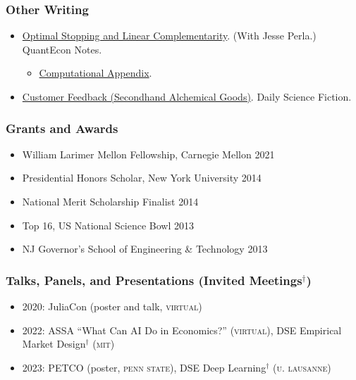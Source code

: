 \documentclass[12pt]{article}   %
\begin{document}
\subsubsection*{Other Writing}
\begin{itemize}
  \item \href{https://notes.quantecon.org/submission/5c832d2be7b4c5000f4c8e48}{Optimal Stopping and Linear Complementarity}. (With Jesse Perla.) QuantEcon Notes.
  \begin{itemize}
    \item \href{https://quantecon.github.io/SimpleDifferentialOperators.jl/v0.4/generated/LCP_advanced.html}{Computational Appendix}.
  \end{itemize}
  \item \href{https://dailysciencefiction.com/fantasy/fantasy/arnav-sood/customer-feedback-secondhand-alchemical-goods}{Customer Feedback (Secondhand Alchemical Goods)}. Daily Science Fiction.
\end{itemize}

\subsubsection*{Grants and Awards}
\begin{itemize}
  \item William Larimer Mellon Fellowship, Carnegie Mellon \hfill 2021
  \item Presidential Honors Scholar, New York University \hfill 2014
  \item National Merit Scholarship Finalist \hfill 2014
  \item Top 16, US National Science Bowl \hfill 2013
  \item NJ Governor's School of Engineering \& Technology \hfill 2013
\end{itemize}

\subsubsection*{Talks, Panels, and Presentations (Invited Meetings$^{\dagger}$)}
\begin{itemize}
  \item 2020: JuliaCon (poster and talk, \textsc{virtual})
  \item 2022: ASSA ``What Can AI Do in Economics?'' (\textsc{virtual}), DSE Empirical Market Design$^{\dagger}$ (\textsc{mit})
  \item 2023: PETCO (poster, \textsc{penn state}), DSE Deep Learning$^{\dagger}$ (\textsc{u. lausanne})
\end{itemize}
\end{document}
